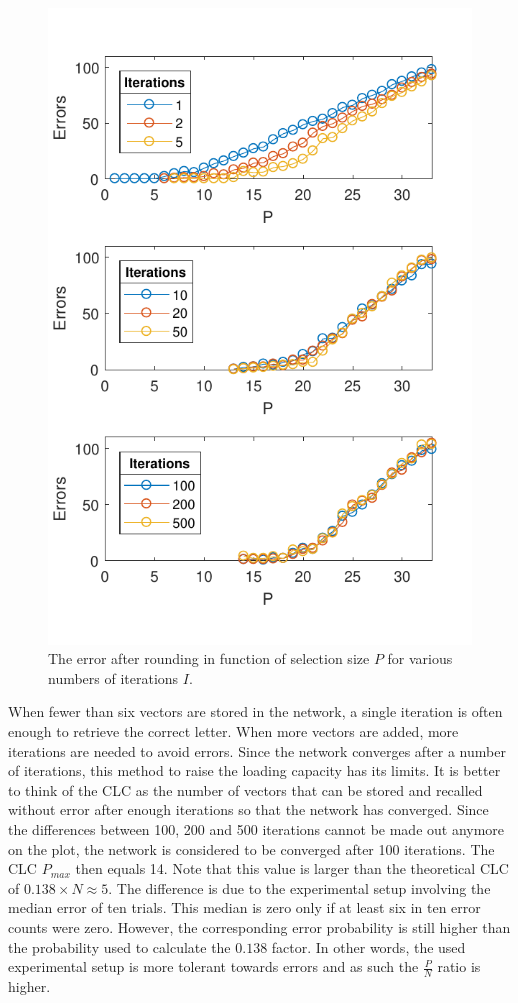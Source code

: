\documentclass[a4, 10pt, twoside, twocolumn]{article}
\numberwithin{figure}{section}
\begin{document}
\begin{figure}[ht]
    \includegraphics[width=\linewidth]{img/Letters_SinglePerf.pdf}
    \caption{The error after rounding in function of selection size $P$ for various numbers of iterations $I$.}
    \label{fig:Letters_SinglePerf}
\end{figure}

When fewer than six vectors are stored in the network, a single iteration is often enough to retrieve the correct letter. When more vectors are added, more iterations are needed to avoid errors. Since the network converges after a number of iterations, this method to raise the loading capacity has its limits. It is better to think of the CLC as the number of vectors that can be stored and recalled without error after enough iterations so that the network has converged. Since the differences between 100, 200 and 500 iterations cannot be made out anymore on the plot, the network is considered to be converged after 100 iterations. The CLC $P_{max}$ then equals 14. Note that this value is larger than the theoretical CLC of $0.138 \times N \approx 5$. The difference is due to the experimental setup involving the median error of ten trials. This median is zero only if at least six in ten error counts were zero. However, the corresponding error probability is still higher than the probability used to calculate the $0.138$ factor. In other words, the used experimental setup is more tolerant towards errors and as such the $\frac{P}{N}$ ratio is higher.
\end{document}
